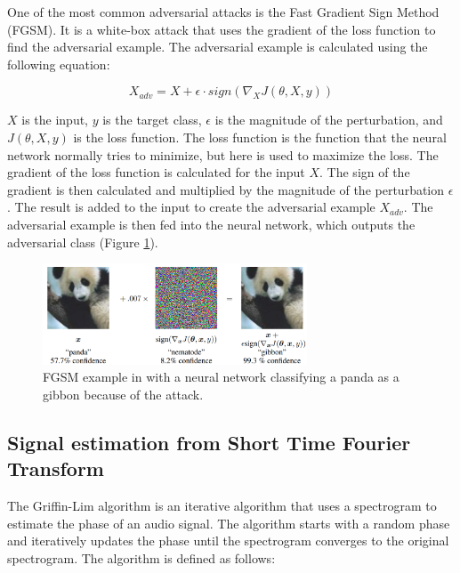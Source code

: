 One of the most common adversarial attacks is the Fast Gradient Sign Method (FGSM)\cite{goodfellow2015explaining}. It is a white-box attack that uses the gradient of the loss function to find the adversarial example. The adversarial example is calculated using the following equation:

\begin{equation}
    X_{adv} = X + \epsilon \cdot sign(\nabla_{X}J(\theta, X, y))
\end{equation}

$X$ is the input, $y$ is the target class, $\epsilon$ is the magnitude of the perturbation, and $J(\theta, X, y)$ is the loss function. The loss function is the function that the neural network normally tries to minimize, but here is used to maximize the loss. The gradient of the loss function is calculated for the input $X$. The sign of the gradient is then calculated and multiplied by the magnitude of the perturbation $\epsilon$. The result is added to the input to create the adversarial example $X_{adv}$. The adversarial example is then fed into the neural network, which outputs the adversarial class (Figure \ref*{fig:fgsm}).

\begin{figure}[H]
    \centering
    \includegraphics[width=0.7\textwidth]{../Images/fgsm.png}
    \caption{FGSM example in \cite{goodfellow2015explaining} with a neural network classifying a panda as a gibbon because of the attack.}
    \label{fig:fgsm}
\end{figure}

\subsection{Signal estimation from Short Time Fourier Transform}

The Griffin-Lim algorithm\cite{6701851} is an iterative algorithm that uses a spectrogram to estimate the phase of an audio signal. The algorithm starts with a random phase and iteratively updates the phase until the spectrogram converges to the original spectrogram. The algorithm is defined as follows:

